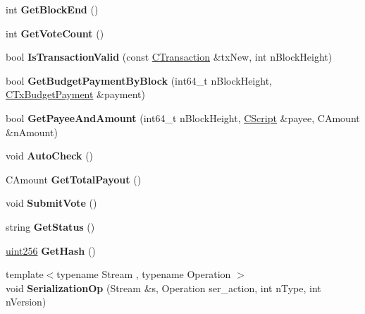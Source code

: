 \begin{DoxyCompactItemize}
\item 
\mbox{\label{class_c_finalized_budget_a45b354d7c3ea65128130cf28e78f4bf4}} 
int {\bfseries Get\+Block\+End} ()
\item 
\mbox{\label{class_c_finalized_budget_a6958b394133bceca95b49c25ce337b06}} 
int {\bfseries Get\+Vote\+Count} ()
\item 
\mbox{\label{class_c_finalized_budget_a32c98c7a24100e099093e7d33b9330f2}} 
bool {\bfseries Is\+Transaction\+Valid} (const \mbox{\hyperlink{class_c_transaction}{C\+Transaction}} \&tx\+New, int n\+Block\+Height)
\item 
\mbox{\label{class_c_finalized_budget_aa5ec8ed8c03ce6bbc1c49edd942501c8}} 
bool {\bfseries Get\+Budget\+Payment\+By\+Block} (int64\+\_\+t n\+Block\+Height, \mbox{\hyperlink{class_c_tx_budget_payment}{C\+Tx\+Budget\+Payment}} \&payment)
\item 
\mbox{\label{class_c_finalized_budget_a75c6ae33fd0079e732e1103d29501d01}} 
bool {\bfseries Get\+Payee\+And\+Amount} (int64\+\_\+t n\+Block\+Height, \mbox{\hyperlink{class_c_script}{C\+Script}} \&payee, C\+Amount \&n\+Amount)
\item 
\mbox{\label{class_c_finalized_budget_a88614fdccb5cdf722403c11832df2ad0}} 
void {\bfseries Auto\+Check} ()
\item 
\mbox{\label{class_c_finalized_budget_a20f2cdac9403d59688b527a98474cc7a}} 
C\+Amount {\bfseries Get\+Total\+Payout} ()
\item 
\mbox{\label{class_c_finalized_budget_a8d5710eaf0fe541dcdce1d5f2ebee51c}} 
void {\bfseries Submit\+Vote} ()
\item 
\mbox{\label{class_c_finalized_budget_a9a6fbb2d494342fb6d1c48a98d7cc856}} 
string {\bfseries Get\+Status} ()
\item 
\mbox{\label{class_c_finalized_budget_a0ce6295086247f5982f93ee3cea956e6}} 
\mbox{\hyperlink{classuint256}{uint256}} {\bfseries Get\+Hash} ()
\item 
\mbox{\label{class_c_finalized_budget_a1bbf758b27a7fb175e2889290f5ef78f}} 
{\footnotesize template$<$typename Stream , typename Operation $>$ }\\void {\bfseries Serialization\+Op} (Stream \&s, Operation ser\+\_\+action, int n\+Type, int n\+Version)
\end{DoxyCompactItemize}
